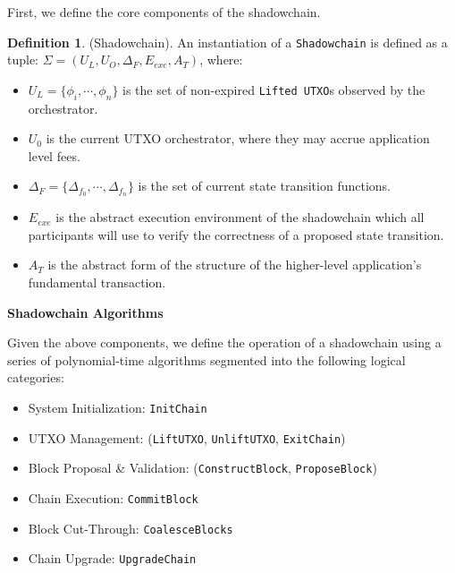 \documentclass[10pt,a4paper]{article}
\theoremstyle{definition}
\newtheorem{definition}{Definition}[section]
\begin{document}
First, we define the core components of the shadowchain. 

\begin{definition}{(Shadowchain).} An instantiation of a \texttt{Shadowchain}
    is defined as a tuple: $\Sigma = (U_{L}, U_{O}, \Delta_F, E_{exe},
    A_{T})$, where:
\end{definition}

\begin{itemize}
    \item $U_{L} = \{\phi_i, \cdots, \phi_n\}$ is the set of non-expired
        \texttt{Lifted UTXO}s observed by the orchestrator.

    \item $U_{0}$ is the current UTXO orchestrator, where they may accrue
        application level fees.

    \item $\Delta_F =  \{ \Delta_{f_0}, \cdots, \Delta_{f_n} \}$ is the set of
        current state transition functions.

    \item $E_{exe}$ is the abstract execution environment of the shadowchain
        which all participants will use to verify the correctness of a proposed
        state transition.

    \item $A_{T}$ is the abstract form of the structure of the higher-level
        application's fundamental transaction.

\end{itemize}

\begin{center}
    \textbf{Shadowchain Algorithms}
\end{center}

Given the above components, we define the operation of a shadowchain using a
series of polynomial-time algorithms segmented into the following logical
categories:

\begin{itemize}
    \item System Initialization: \texttt{InitChain}
    \item UTXO Management: (\texttt{LiftUTXO}, \texttt{UnliftUTXO}, \texttt{ExitChain})
    \item Block Proposal \& Validation: (\texttt{ConstructBlock}, \texttt{ProposeBlock})
    \item Chain Execution: \texttt{CommitBlock}
    \item Block Cut-Through: \texttt{CoalesceBlocks}
    \item Chain Upgrade: \texttt{UpgradeChain}
\end{itemize}
\end{document}
